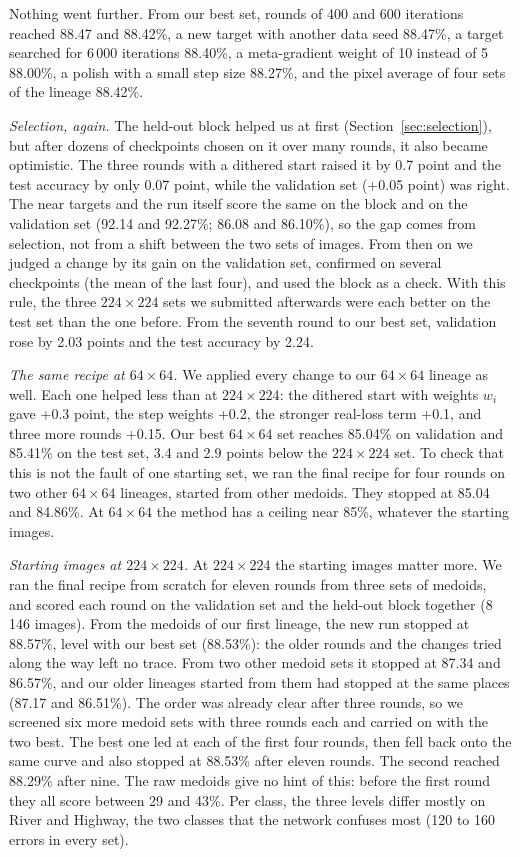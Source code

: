 \documentclass[journal]{IEEEtran}
\begin{document}
Nothing went further. From our best set, rounds of 400 and 600 iterations reached 88.47 and 88.42\%, a new target
with another data seed 88.47\%, a target searched for 6\,000 iterations 88.40\%, a meta-gradient weight of 10
instead of 5 88.00\%, a polish with a small step size 88.27\%, and the pixel average of four sets of the lineage
88.42\%.

\emph{Selection, again.} The held-out block helped us at first (Section~\ref{sec:selection}), but after dozens of
checkpoints chosen on it over many rounds, it also became optimistic. The three rounds with a dithered start raised
it by 0.7 point and the test accuracy by only 0.07 point, while the validation set (+0.05 point) was right. The near
targets and the run itself score the same on the block and on the validation set (92.14 and 92.27\%; 86.08 and
86.10\%), so the gap comes from selection, not from a shift between the two sets of images. From then on we judged a
change by its gain on the validation set, confirmed on several checkpoints (the mean of the last four), and used the
block as a check. With this rule, the three $224\times224$ sets we submitted afterwards were each better on the test
set than the one before. From the seventh round to our best set, validation rose by 2.03 points and the test accuracy by 2.24.

\emph{The same recipe at $64\times64$.} We applied every change to our $64\times64$ lineage as well. Each one helped
less than at $224\times224$: the dithered start with weights $w_i$ gave +0.3 point, the step weights +0.2, the
stronger real-loss term +0.1, and three more rounds +0.15. Our best $64\times64$ set reaches 85.04\% on validation and 85.41\% on the test set,
3.4 and 2.9 points below the $224\times224$ set. To check that this is not the fault of one starting set, we ran
the final recipe for four rounds on two other $64\times64$ lineages, started from other medoids. They stopped at
85.04 and 84.86\%. At $64\times64$ the method has a ceiling near 85\%, whatever the starting images.

\emph{Starting images at $224\times224$.} At $224\times224$ the starting images matter more. We ran the final recipe
from scratch for eleven rounds from three sets of medoids, and scored each round on the validation set and the
held-out block together (8\,146 images). From the medoids of our first lineage, the new run stopped at 88.57\%, level
with our best set (88.53\%): the older rounds and the changes tried along the way left no trace. From two other medoid
sets it stopped at 87.34 and 86.57\%, and our older lineages started from them had stopped at the same places (87.17
and 86.51\%). The order was already clear after three rounds, so we screened six more medoid sets with three rounds
each and carried on with the two best. The best one led at each of the first four rounds, then fell back onto the
same curve and also stopped at 88.53\% after eleven rounds. The second reached 88.29\% after nine. The raw medoids give
no hint of this: before the first round they all score between 29 and 43\%. Per class, the three levels differ mostly
on River and Highway, the two classes that the network confuses most (120 to 160 errors in every set).
\end{document}
